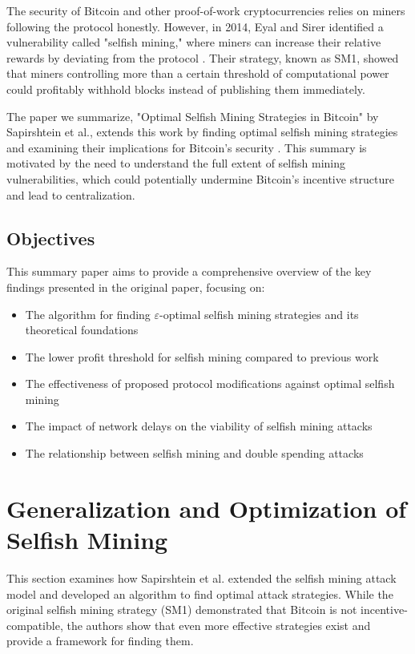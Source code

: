 \documentclass[conference]{IEEEtran}
\begin{document}
The security of Bitcoin and other proof-of-work cryptocurrencies relies on miners following the protocol honestly. 
However, in 2014, Eyal and Sirer identified a vulnerability called "selfish mining," 
where miners can increase their relative rewards by deviating from the protocol \cite{eyal2018majority}. 
Their strategy, known as SM1, showed that miners controlling more than a certain threshold of computational power 
could profitably withhold blocks instead of publishing them immediately.

The paper we summarize, "Optimal Selfish Mining Strategies in Bitcoin" by Sapirshtein et al., extends this work by finding optimal selfish mining strategies and examining their implications for Bitcoin's security \cite{sapirshtein2016optimal}. This summary is motivated by the need to understand the full extent of selfish mining vulnerabilities, which could potentially undermine Bitcoin's incentive structure and lead to centralization.

\subsection{Objectives}

This summary paper aims to provide a comprehensive overview of the key findings presented in the original paper, focusing on:

\begin{itemize}
    \item The algorithm for finding $\varepsilon$-optimal selfish mining strategies and its theoretical foundations
    \item The lower profit threshold for selfish mining compared to previous work
    \item The effectiveness of proposed protocol modifications against optimal selfish mining
    \item The impact of network delays on the viability of selfish mining attacks
    \item The relationship between selfish mining and double spending attacks
\end{itemize}


\section{Generalization and Optimization of Selfish Mining}

This section examines how Sapirshtein et al. extended the selfish mining attack model and developed an algorithm to find optimal attack strategies. While the original selfish mining strategy (SM1) demonstrated that Bitcoin is not incentive-compatible, the authors show that even more effective strategies exist and provide a framework for finding them.
\end{document}

